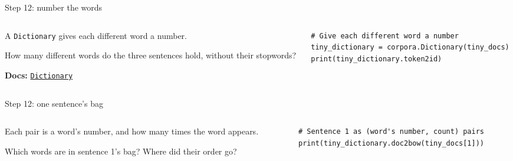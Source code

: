 \documentclass[9pt,aspectratio=169]{beamer}
\begin{document}
\begin{frame}[fragile]{Step 12: number the words}
    \begin{columns}[T]
        \begin{column}{0.37\textwidth}
            A \texttt{Dictionary} gives each different word a number.

            \medskip
            How many different words do the three sentences hold, without their stopwords?

            \medskip
            {\scriptsize\textbf{Docs:} \href{https://radimrehurek.com/gensim/corpora/dictionary.html}{\texttt{Dictionary}}\par}
        \end{column}
        \begin{column}{0.6\textwidth}
\begin{lstlisting}
# Give each different word a number
tiny_dictionary = corpora.Dictionary(tiny_docs)
print(tiny_dictionary.token2id)
\end{lstlisting}
        \end{column}
    \end{columns}
\end{frame}

\begin{frame}[fragile]{Step 12: one sentence's bag}
    \begin{columns}[T]
        \begin{column}{0.37\textwidth}
            Each pair is a word's number, and how many times the word appears.

            \medskip
            Which words are in sentence 1's bag? Where did their order go?
        \end{column}
        \begin{column}{0.6\textwidth}
\begin{lstlisting}
# Sentence 1 as (word's number, count) pairs
print(tiny_dictionary.doc2bow(tiny_docs[1]))
\end{lstlisting}
        \end{column}
    \end{columns}
\end{frame}
\end{document}
